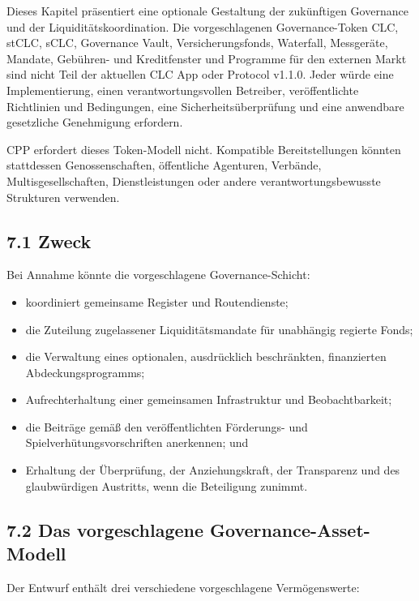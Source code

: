 \documentclass[11pt]{article}
\begin{document}
Dieses Kapitel präsentiert eine optionale Gestaltung der zukünftigen Governance und der Liquiditätskoordination. Die vorgeschlagenen Governance-Token CLC, stCLC, sCLC, Governance Vault, Versicherungsfonds, Waterfall, Messgeräte, Mandate, Gebühren- und Kreditfenster und Programme für den externen Markt sind nicht Teil der aktuellen CLC App oder Protocol v1.1.0. Jeder würde eine Implementierung, einen verantwortungsvollen Betreiber, veröffentlichte Richtlinien und Bedingungen, eine Sicherheitsüberprüfung und eine anwendbare gesetzliche Genehmigung erfordern.

CPP erfordert dieses Token-Modell nicht. Kompatible Bereitstellungen könnten stattdessen Genossenschaften, öffentliche Agenturen, Verbände, Multisgesellschaften, Dienstleistungen oder andere verantwortungsbewusste Strukturen verwenden.

\subsection*{7.1 Zweck}

Bei Annahme könnte die vorgeschlagene Governance-Schicht:

\begin{itemize}[leftmargin=*]
\item koordiniert gemeinsame Register und Routendienste;
\item die Zuteilung zugelassener Liquiditätsmandate für unabhängig regierte Fonds;
\item die Verwaltung eines optionalen, ausdrücklich beschränkten, finanzierten Abdeckungsprogramms;
\item Aufrechterhaltung einer gemeinsamen Infrastruktur und Beobachtbarkeit;
\item die Beiträge gemäß den veröffentlichten Förderungs- und Spielverhütungsvorschriften anerkennen; und
\item Erhaltung der Überprüfung, der Anziehungskraft, der Transparenz und des glaubwürdigen Austritts, wenn die Beteiligung zunimmt.
\end{itemize}
\subsection*{7.2 Das vorgeschlagene Governance-Asset-Modell}

Der Entwurf enthält drei verschiedene vorgeschlagene Vermögenswerte:
\end{document}
